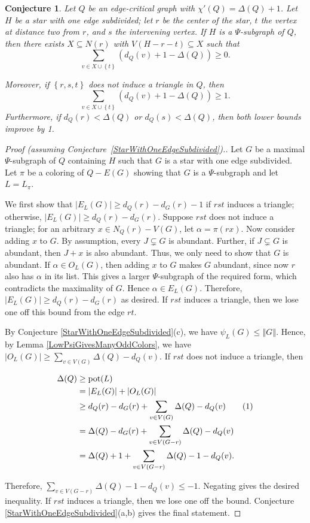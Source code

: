 \documentclass[12pt]{article}
\theoremstyle{plain}
\newtheorem{conjecture}[thm]{Conjecture}
\theoremstyle{definition}
\theoremstyle{remark}
\newcommand{\set}[1]{\left\{ #1 \right\}}
\newcommand{\card}[1]{\left|#1\right|}
\newcommand{\size}[1]{\left\Vert#1\right\Vert}
\newcommand{\pot}{\operatorname{pot}}
\newcommand\numberthis{\addtocounter{equation}{1}\tag{\theequation}}
\begin{document}
\begin{conjecture}\label{AdjacencyPrecursor}
Let $Q$ be an edge-critical graph with $\chi'(Q) = \Delta(Q) + 1$.  
Let $H$ be a star with one edge subdivided; let $r$ be the center of the star,
$t$ the vertex at distance two from $r$, and $s$ the intervening vertex. 
If $H$ is a $\Psi$-subgraph of $Q$, 
then there exists $X \subseteq N(r)$ with $V(H - r - t)
\subseteq X$ such that \[\sum_{v \in X \cup \set{t}} (d_Q(v) + 1 - \Delta(Q))
\ge 0.\]  
	
\noindent Moreover, if $\set{r,s,t}$ does not induce a triangle in $Q$, then 
\[\sum_{v \in X \cup \set{t}} (d_Q(v) + 1 - \Delta(Q)) \ge 1.\]
Furthermore, if $d_Q(r)<\Delta(Q)$ or $d_Q(s)<\Delta(Q)$, then both lower
bounds improve by 1.
\end{conjecture}
\begin{proof}[Proof (assuming Conjecture~\ref{StarWithOneEdgeSubdivided}).]
Let $G$ be a maximal $\Psi$-subgraph of $Q$ containing $H$ such that $G$
is a star with one edge subdivided.  Let $\pi$ be a coloring of $Q - E(G)$
showing that $G$ is a $\Psi$-subgraph and let $L = L_\pi$.  
	
We first show that $\card{E_{L}(G)} \ge d_Q(r) - d_G(r) - 1$ if $rst$ induces a
triangle; otherwise, $\card{E_{L}(G)} \ge d_Q(r) - d_G(r)$.
Suppose $rst$ does not induce a triangle; for an arbitrary $x \in N_Q(r) - V(G)$,
let $\alpha=\pi(rx)$.  Now consider adding $x$ to $G$.  
By assumption, every $J\subsetneq G$ is abundant.  Further, if $J\subsetneq G$
is abundant, then $J+x$ is also abundant.  Thus, we only need to show that $G$
is abundant.  If $\alpha \in O_{L}(G)$, then adding $x$ to $G$ makes $G$
abundant, since now $r$ also has $\alpha$ in its list.  This gives a larger
$\Psi$-subgraph of the required form, which contradicts the maximality of
$G$.  Hence $\alpha \in E_{L}(G)$.  Therefore, $\card{E_{L}(G)} \ge d_Q(r) -
d_G(r)$ as desired.  If $rst$ induces a triangle, then we lose one off this
bound from the edge $rt$.
	
By Conjecture \ref{StarWithOneEdgeSubdivided}(c), we have $\psi_L(G) \le
\size{G}$.  Hence, by Lemma \ref{LowPsiGivesManyOddColors}, we have
$\card{O_{L}(G)} \ge \sum_{v \in V(G)} \Delta(Q) - d_Q(v)$.  If $rst$ does
not induce a triangle, then
	
\begin{align*}
\Delta(Q) &\ge \pot(L)\\
&= \card{E_{L}(G)} + \card{O_{L}(G)}\\
&\ge d_Q(r) - d_G(r) + \sum_{v \in V(G)} \Delta(Q) - d_Q(v) \numberthis
\label{strict-ineq}\\
&= \Delta(Q) - d_G(r) + \sum_{v \in V(G - r)} \Delta(Q) - d_Q(v)\\
&= \Delta(Q) + 1 +\sum_{v \in V(G - r)} \Delta(Q) - 1 - d_Q(v).
\end{align*}
	
Therefore, $\sum_{v \in V(G - r)} \Delta(Q) - 1 - d_Q(v) \le -1$.  Negating
gives the desired inequality.  If $rst$ induces a triangle, then we lose one
off the bound.  Conjecture \ref{StarWithOneEdgeSubdivided}(a,b) gives the final
statement.
\end{proof}
\end{document}
